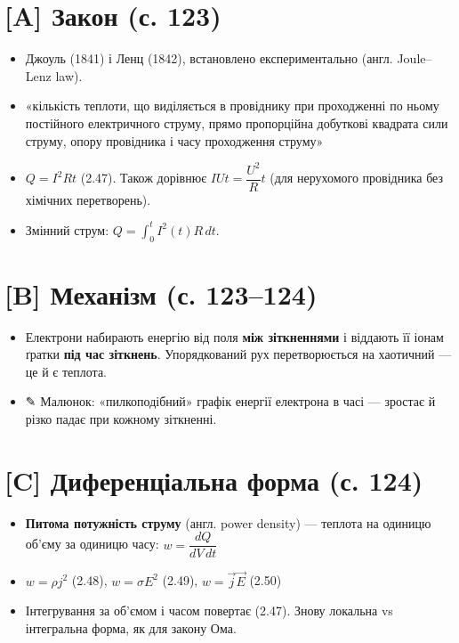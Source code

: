 \documentclass[11pt,a4paper,oneside]{book}
\newcommand{\pen}{{\sffamily\color{accent}✎}}
\begin{document}
\section*{[A] Закон (с. 123)}
\begin{itemize}
\item Джоуль (1841) і Ленц (1842), встановлено експериментально (англ. Joule–Lenz law).
\item «кількість теплоти, що виділяється в провіднику при проходженні по ньому постійного електричного струму, прямо пропорційна добуткові квадрата сили струму, опору провідника і часу проходження струму»
\item $Q = I^2Rt$ (2.47). Також дорівнює $IUt = \dfrac{U^2}{R}t$ (для нерухомого провідника без хімічних перетворень).
\item Змінний струм: $Q = \int_0^t I^2(t)R\,dt$.
\end{itemize}

\section*{[B] Механізм (с. 123–124)}
\begin{itemize}
\item Електрони набирають енергію від поля \textbf{між зіткненнями} і віддають її іонам ґратки \textbf{під час зіткнень}. Упорядкований рух перетворюється на хаотичний — це й є теплота.
\item \pen{} Малюнок: «пилкоподібний» графік енергії електрона в часі — зростає й різко падає при кожному зіткненні.
\end{itemize}

\section*{[C] Диференціальна форма (с. 124)}
\begin{itemize}
\item \textbf{Питома потужність струму} (англ. power density) — теплота на одиницю об'єму за одиницю часу: $w = \dfrac{dQ}{dV\,dt}$
\item $w = \rho j^2$ (2.48), $w = \sigma E^2$ (2.49), $w = \vec j\vec E$ (2.50)
\item Інтегрування за об'ємом і часом повертає (2.47). Знову локальна vs інтегральна форма, як для закону Ома.
\end{itemize}
\end{document}
